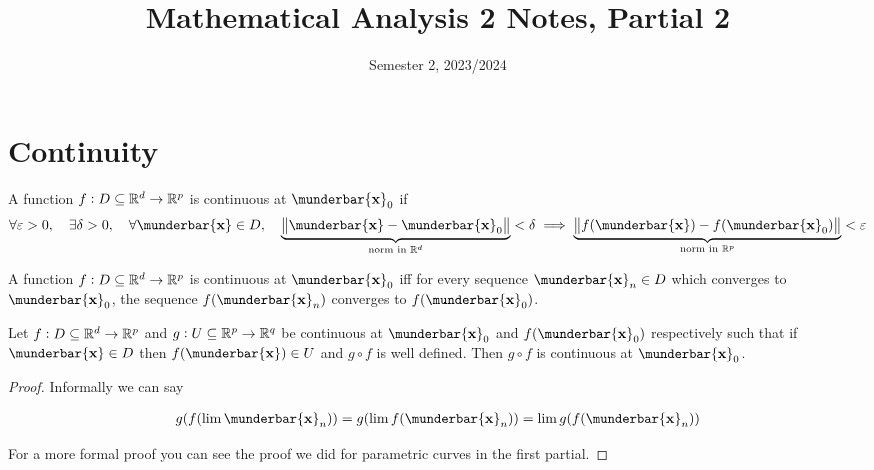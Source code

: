 \documentclass[14pt]{extarticle}
\title{Mathematical Analysis 2 Notes, Partial 2}
\date{Semester 2, 2023/2024}
\renewcommand{\vec}[1]{\munderbar{\mathbf{#1}}}
\begin{document}
\maketitle
\tableofcontents
\clearpage


\section{Continuity}

\begin{definition}[continuity]
    A function $f: D \subseteq \mathbb{R}^d \to \mathbb{R}^p$ is continuous at $\vec{x}_0$ if
    \begin{equation}
        \forall \varepsilon > 0,
        \quad
        \exists \delta > 0,
        \quad
        \forall \vec{x} \in D,
        \quad
        \underbrace{\norm{\vec{x} - \vec{x}_0}}_{\text{norm in } \R^d} < \delta
        \implies
        \underbrace{\norm{f(\vec{x}) - f(\vec{x}_0)}}_{\text{norm in } \R^p} < \varepsilon
    \end{equation}
\end{definition}

\begin{proposition}
    A function $f: D \subseteq \mathbb{R}^d \to \mathbb{R}^p$ is continuous at $\vec{x}_0$ iff for every sequence $\vec{x}_n \in D$ which converges to $\vec{x}_0$, the sequence $f(\vec{x}_n)$ converges to $f(\vec{x}_0)$.
\end{proposition}

\begin{proposition}
    Let $f: D \subseteq \mathbb{R}^d \to \mathbb{R}^p$ and $g: U \subseteq \mathbb{R}^p \to \mathbb{R}^q$ be continuous at $\vec{x}_0$ and $f(\vec{x}_0)$ respectively such that if $\vec{x} \in D$ then $f(\vec{x}) \in U$ and $g \circ f$ is well defined.
    Then $g \circ f$ is continuous at $\vec{x}_0$.
\end{proposition}

\begin{proof}
    Informally we can say

    \begin{align}
        g(f(\lim \vec{x}_n)) = g(\lim f(\vec{x}_n)) = \lim g(f(\vec{x}_n))
    \end{align}

    For a more formal proof you can see the proof we did for parametric curves in the first partial.
\end{proof}
\end{document}

